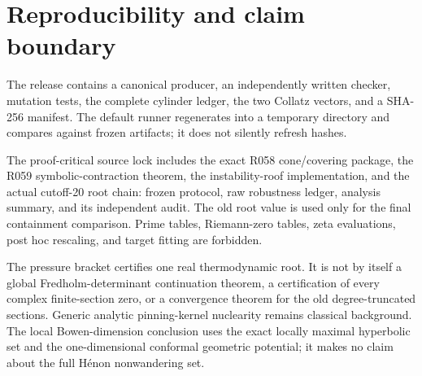 \section{Reproducibility and claim boundary}
\label{app:reproducibility}

The release contains a canonical producer, an independently written checker,
mutation tests, the complete cylinder ledger, the two Collatz vectors, and a
SHA-256 manifest.  The default runner regenerates into a temporary directory
and compares against frozen artifacts; it does not silently refresh hashes.

The proof-critical source lock includes the exact R058 cone/covering package,
the R059 symbolic-contraction theorem, the instability-roof implementation,
and the actual cutoff-20 root chain: frozen protocol, raw robustness ledger,
analysis summary, and its independent audit.  The old root value is used only
for the final containment comparison.  Prime tables, Riemann-zero tables,
zeta evaluations, post hoc rescaling, and target fitting are forbidden.

The pressure bracket certifies one real thermodynamic root.  It is not by
itself a global Fredholm-determinant continuation theorem, a certification of
every complex finite-section zero, or a convergence theorem for the old
degree-truncated sections.  Generic analytic pinning-kernel nuclearity remains
classical background.  The local Bowen-dimension conclusion uses the exact
locally maximal hyperbolic set and the one-dimensional conformal geometric
potential; it makes no claim about the full H\'enon nonwandering set.
